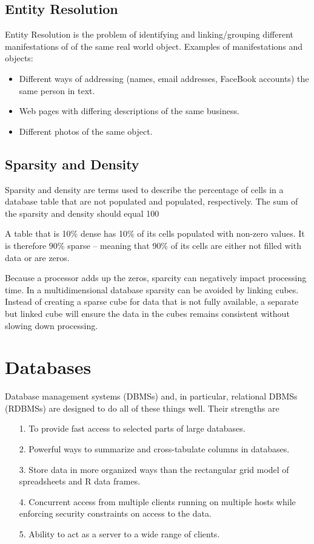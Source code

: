 \documentclass[12pt]{article}
\begin{document}
\subsection{Entity Resolution}

Entity Resolution is the problem of identifying and linking/grouping different manifestations of of the same real world object. Examples of manifestations and objects:
\begin{itemize}
\item Different ways of addressing (names, email addresses, FaceBook
accounts) the same person in text.
\item Web pages with differing descriptions of the same business.
\item Different photos of the same object.
\end{itemize} 

\subsection{Sparsity and Density}
Sparsity and density are terms used to describe the percentage of cells in a database table that are not populated and populated, respectively. The sum of the sparsity and density should equal 100%

A table that is 10\% dense has 10\% of its cells populated with non-zero values. It is therefore 90\% sparse – meaning that 90\% of its cells are either not filled with data or are zeros.

Because a processor adds up the zeros, sparcity can negatively impact processing time. In a multidimensional database sparsity can be avoided by linking cubes. Instead of creating a sparse cube for data that is not fully available, a separate but linked cube will ensure the data in the cubes remains consistent without slowing down processing.



\section{Databases}
Database management systems (DBMSs) and, in particular, relational DBMSs (RDBMSs)
are designed to do all of these things well. Their strengths are

\begin{itemize}
\item[1.] To provide fast access to selected parts of large databases.
\item[2.] Powerful ways to summarize and cross-tabulate columns in databases.
\item[3.] Store data in more organized ways than the rectangular grid model of spreadsheets and R
data frames.
\item[4.] Concurrent access from multiple clients running on multiple hosts while enforcing security
constraints on access to the data.
\item[5.] Ability to act as a server to a wide range of clients.
\end{itemize}
\end{document}
